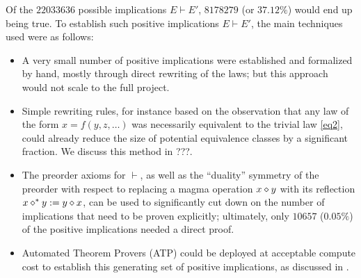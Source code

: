 Of the $22033636$ possible implications $E \vdash E'$, $8178279$ (or $37.12\%$) would end up being true. To establish such positive implications $E \vdash E'$, the main techniques used were as follows:

\begin{itemize}
\item A very small number of positive implications were established and formalized by hand, mostly through direct rewriting of the laws; but this approach would not scale to the full project.
\item  Simple rewriting rules, for instance based on the observation that any law of the form $x = f(y,z,\dots)$ was necessarily equivalent to the trivial law \eqref{eq2}, could already reduce the size of potential equivalence classes by a significant fraction.  We discuss this method in ???.
\item The preorder axioms for $\vdash$, as well as the ``duality'' symmetry of the preorder with respect to replacing a magma operation $x \diamond y$ with its reflection $x \diamond^* y := y \diamond x$, can be used to significantly cut down on the number of implications that need to be proven explicitly; ultimately, only $10657$ ($0.05\%$) of the positive implications needed a direct proof.
\item  Automated Theorem Provers (ATP) could be deployed at acceptable compute cost to establish this generating set of positive implications, as discussed in .
\end{itemize}

